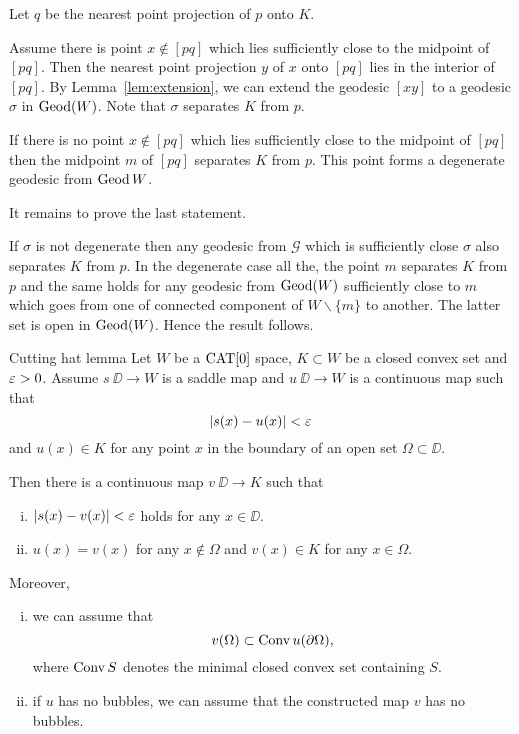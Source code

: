 \documentclass{article}
\begin{document}
Let $q$ be the nearest point projection of $p$ onto $K$.

Assume there is point $x\not\in [pq]$ which lies sufficiently close to the midpoint of $[pq]$.
Then the nearest point projection $y$ of $x$ onto $[pq]$ lies in the interior of $[pq]$.
By Lemma~\ref{lem:extension},
we can extend the geodesic $[xy]$ to a geodesic $\sigma$ in $\mathop{\rm Geod}\nolimits(W)$.
Note that $\sigma$ separates $K$ from $p$.

If there is no point $x\not\in [pq]$ which lies sufficiently close to the midpoint of $[pq]$
then the midpoint $m$ of $[pq]$ separates $K$ from $p$.
This point forms a degenerate geodesic from $\mathop{\rm Geod}\nolimits W$.

It remains to prove the last statement.

If $\sigma$ is not degenerate then any geodesic from $\mathcal{G}$ which is sufficiently close $\sigma$ also separates $K$ from $p$.
In the degenerate case all the, 
the point $m$ separates $K$ from $p$ 
and the same holds for any geodesic from $\mathop{\rm Geod}\nolimits(W)$ sufficiently close to $m$ which goes from one of connected component of $W\backslash\{m\}$ to another.
The latter  set is open in $\mathop{\rm Geod}\nolimits(W)$.
Hence the result follows.
\qeds




\begin{thm}{Cutting hat lemma}\label{lem:cutting-hat}
Let 
$W$ be a $\mathop{\rm CAT}\nolimits[0]$ space, 
$K\subset W$ be a closed convex set 
and $\varepsilon>0$.
Assume $s\:\DD\to W$ is a saddle map 
and $u\:\DD\to W$ is a continuous map such that 
\[|s(x)-u(x)|<\varepsilon\]
and $u(x)\in K$ for any point $x$ in the boundary of an open set $\Omega\subset \DD$.

Then there is a continuous map $v\:\DD\to K$ such that 
\begin{enumerate}[(i)]
\item $|s(x)-v(x)|<\varepsilon$ holds for any $x\in\DD$.
\item $u(x)=v(x)$ for any $x\notin\Omega$ and
$v(x)\in K$ for any $x\in\Omega$.
\end{enumerate}

Moreover,
\begin{enumerate}[(i)]
\addtocounter{enumi}{2}
\item we can assume that \[v(\Omega)\subset \mathop{\rm Conv}\nolimits u(\partial\Omega),\]
where $\mathop{\rm Conv}\nolimits S$ denotes the minimal closed convex set containing $S$.
\item\label{lem:cutting-hat:b} if $u$ has no bubbles, we can assume that the constructed map $v$ has no bubbles.
\end{enumerate}
\end{thm}
\end{document}
